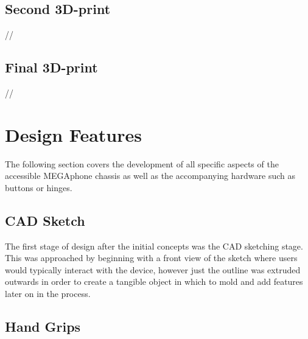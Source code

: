 
\subsection{Second 3D-print}
//

\subsection{Final 3D-print}
//


\section{Design Features}

The following section covers the development of all specific aspects of the accessible MEGAphone chassis as well as the accompanying hardware such as buttons or hinges.

\subsection{CAD Sketch}

The first stage of design after the initial concepts was the CAD sketching stage.
This was approached by beginning with a front view of the sketch where users would typically interact with the device, however just the outline was extruded outwards in order to create a tangible object in which to mold and add features later on in the process.

\subsection{Hand Grips}

